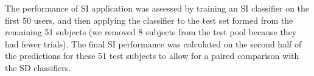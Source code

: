 The performance of \ac{SI} application was assessed by training an \ac{SI}
classifier on the first 50 users, and then applying the classifier to the test
set formed from the remaining 51 subjects (we removed 8 subjects from the test
pool because they had fewer trials). The final \ac{SI} performance was
calculated on the second half of the predictions for these 51 test subjects to
allow for a paired comparison with the \ac{SD} classifiers.
